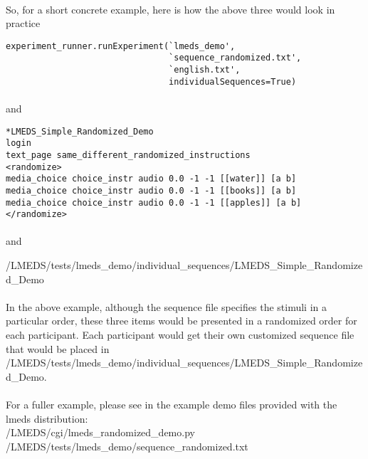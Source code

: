 \paragraph{}
So, for a short concrete example, here is how the above three would look in practice


\begin{lstlisting}
experiment_runner.runExperiment(`lmeds_demo',
                                `sequence_randomized.txt',
                                `english.txt',
                                individualSequences=True)
\end{lstlisting}

\paragraph{}
and 

\begin{lstlisting}
*LMEDS_Simple_Randomized_Demo
login
text_page same_different_randomized_instructions
<randomize>
media_choice choice_instr audio 0.0 -1 -1 [[water]] [a b]
media_choice choice_instr audio 0.0 -1 -1 [[books]] [a b]
media_choice choice_instr audio 0.0 -1 -1 [[apples]] [a b]
</randomize>
\end{lstlisting}

\paragraph{}
and

/LMEDS/tests/lmeds\_demo/individual\_sequences/LMEDS\_Simple\_Randomized\_Demo

\paragraph{}
In the above example, although the sequence file specifies the stimuli in a particular order, these three items would be presented in a randomized order for each participant.  Each participant would get their own customized sequence file that would be placed in /LMEDS/tests/lmeds\_demo/individual\_sequences/LMEDS\_Simple\_Randomized\_Demo.

\paragraph{}
For a fuller example, please see in the example demo files provided with the lmeds distribution: \\
/LMEDS/cgi/lmeds\_randomized\_demo.py \\
/LMEDS/tests/lmeds\_demo/sequence\_randomized.txt

